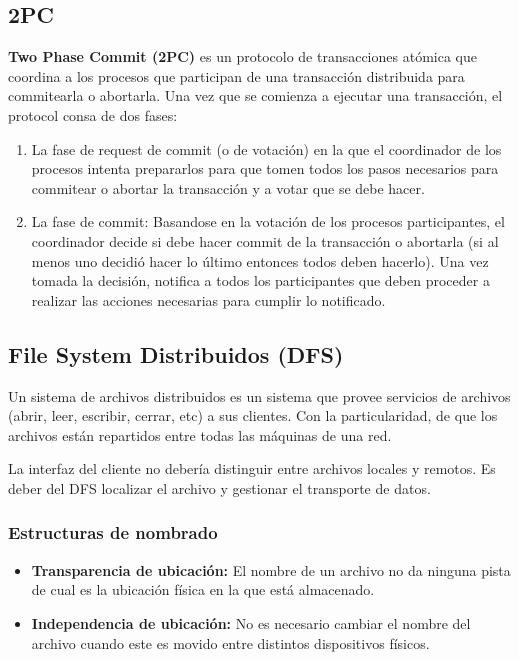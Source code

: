 \subsection{2PC}
\textbf{Two Phase Commit (2PC)} es un protocolo de transacciones atómica que coordina a los procesos que participan de una transacción distribuida para commitearla o abortarla. Una vez que se comienza a ejecutar una transacción, el protocol consa de dos fases:

\begin{enumerate}
	\item La fase de request de commit (o de votación) en la que el coordinador de los procesos intenta prepararlos para que tomen todos los pasos necesarios para commitear o abortar la transacción y a votar que se debe hacer.
	\item La fase de commit: Basandose en la votación de los procesos participantes, el coordinador decide si debe hacer commit de la transacción o abortarla (si al menos uno decidió hacer lo último entonces todos deben hacerlo). Una vez tomada la decisión, notifica a todos los participantes que deben proceder a realizar las acciones necesarias para cumplir lo notificado.
\end{enumerate}


\subsection{File System Distribuidos (DFS)}
Un sistema de archivos distribuidos es un sistema que provee servicios de archivos (abrir, leer, escribir, cerrar, etc) a sus clientes. Con la particularidad, de que los archivos están repartidos entre todas las máquinas de una red. 

La interfaz del cliente no debería distinguir entre archivos locales y remotos. Es deber del DFS localizar el archivo y gestionar el transporte de datos.

\subsubsection{Estructuras de nombrado}
\begin{itemize}
	\item \textbf{Transparencia de ubicación:} El nombre de un archivo no da ninguna pista de cual es la ubicación física en la que está almacenado.
	\item \textbf{Independencia de ubicación:} No es necesario cambiar el nombre del archivo cuando este es movido entre distintos dispositivos físicos.
\end{itemize}

